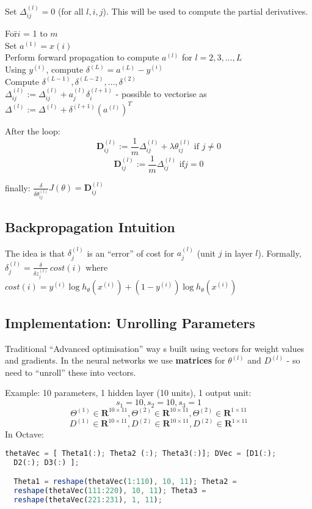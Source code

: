 \documentclass{scrartcl}
\begin{document}
Set $\Delta_{ij}^{(l)} = 0$ (for all $l, i, j$). This will be used to
compute the partial derivatives.
\begin{tabbing}
  For\quad \=$i$ = 1 to $m$  \\
  \>Set $a^{(1)} = x{(i)}$ \\
  \>Perform forward propagation to compute $a^{(l)}$ for $l = 2, 3,
  \dots, L $ \\
  \>Using $y^{(i)}$, compute $\delta^{(L)} = a^{(L)} - y^{(i)}$ \\
  \>Compute $\delta^{(L-1)}, \delta^{(L-2)}, \dots, \delta^{(2)}$ \\
  \>$\Delta_{ij}^{(l)} := \Delta_{ij}^{(l)} + a_j^{(l)}
  \delta_i^{(l+1)}$ - possible to vectorise as $\Delta^{(l)} :=
  \Delta^{(l)} + \delta^{(l+1)}(a^{(l)})^T$ \\
\end{tabbing}   

After the loop:
\[ \mathbf{D}_{ij}^{(l)} := \frac{1}{m}\Delta_{ij}^{(l)} + \lambda
\theta_{ij}^{(l)} \textrm{ if }j \ne 0 \]
\[ \mathbf{D}_{ij}^{(l)} := \frac{1}{m}\Delta_{ij}^{(l)} \textrm{ if
}j = 0\]

finally: $\frac{\delta}{\delta \theta_{ij}^{(l)}} J(\theta) =
\mathbf{D}_{ij}^{(l)}$

\subsection{Backpropagation Intuition}
\label{sec:9-3}

The idea is that $\delta_j^{(l)}$ is an ``error'' of cost for
$a_j^{(l)}$ (unit $j$ in layer $l$). Formally, $\delta_j^{(l)} =
\frac{\delta}{\delta z_j^{(l)}} \, cost(i)$ where $cost(i) = y^{(i)}
\log h_\theta(x^{(i)}) + (1 - y^{(i)}) \log h_\theta(x^{(i)})$

\subsection{Implementation: Unrolling Parameters}
\label{sec:9-4}
Traditional ``Advanced optimisation'' way s built using vectors for
weight values and gradients. In the neural networks we use{\bf
  matrices} for $\theta^{(l)}$ and $D^{(l)}$ - so need to ``unroll''
these into vectors.

Example: 10 parameters, 1 hidden layer (10 units), 1 output unit:
\[ s_1 = 10, s_2 = 10, s_3 = 1\]
\[ \Theta^{(1)} \in \mathbf{R}^{10\times11}, \Theta^{(2)} \in
\mathbf{R}^{10\times11}, \Theta^{(2)} \in \mathbf{R}^{1\times 11} \]
\[ D^{(1)} \in \mathbf{R}^{10\times11}, D^{(2)} \in
\mathbf{R}^{10\times11}, D^{(2)} \in \mathbf{R}^{1\times 11} \] In
Octave:
\begin{lstlisting}[language=Octave, caption=={Plugin function }]
  thetaVec = [ Theta1(:); Theta2 (:); Theta3(:)]; DVec = [D1(:);
  D2(:); D3(:) ];

  Theta1 = reshape(thetaVec(1:110), 10, 11); Theta2 =
  reshape(thetaVec(111:220), 10, 11); Theta3 =
  reshape(thetaVec(221:231), 1, 11);
\end{lstlisting}
\end{document}
